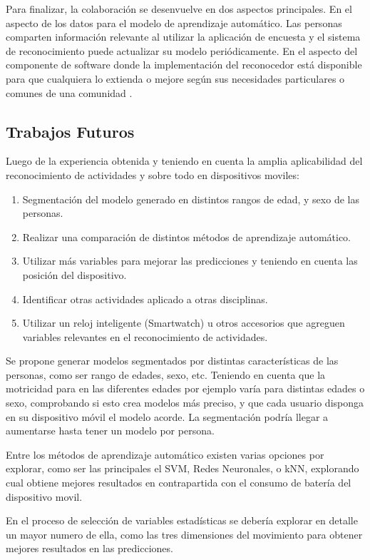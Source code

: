 Para finalizar, la colaboración se desenvuelve en dos aspectos principales.
En el aspecto de los datos para el modelo de aprendizaje automático.
Las personas comparten información relevante al utilizar la aplicación
de encuesta y el sistema de reconocimiento puede actualizar su modelo
periódicamente. En el aspecto del componente de software donde la
implementación del reconocedor está disponible para que cualquiera
lo extienda o mejore según sus necesidades particulares o comunes
de una comunidad \cite{hardroid2016b}.

\subsection{Trabajos Futuros}
Luego de la experiencia obtenida y teniendo en cuenta la amplia aplicabilidad del reconocimiento de actividades y sobre todo en dispositivos moviles:
\begin{enumerate}
	\item Segmentación del modelo generado en distintos rangos de edad, y sexo de las personas.
	\item Realizar una comparación de distintos métodos de aprendizaje automático. 
	\item Utilizar más variables para mejorar las predicciones y teniendo en cuenta las posición del dispositivo.
	\item Identificar otras actividades aplicado a otras disciplinas.
	\item Utilizar un reloj inteligente (Smartwatch) u otros accesorios que agreguen variables relevantes en el reconocimiento de actividades.
\end{enumerate}

Se propone generar modelos segmentados por distintas características de las personas, como ser rango de edades, sexo, etc. Teniendo en cuenta que la motricidad para en las diferentes edades por ejemplo varía para distintas edades o sexo, comprobando si esto crea modelos más preciso, y que cada usuario disponga en su dispositivo móvil el modelo acorde. La segmentación podría llegar a aumentarse hasta tener un modelo por persona.

Entre los métodos de aprendizaje automático existen varias opciones por explorar, como ser las principales el SVM, Redes Neuronales, o kNN, explorando cual obtiene mejores resultados en contrapartida con el consumo de batería del dispositivo movil.

En el proceso de selección de variables estadísticas se debería explorar en detalle un mayor numero de ella, como las tres dimensiones del movimiento para obtener mejores resultados en las predicciones. 

